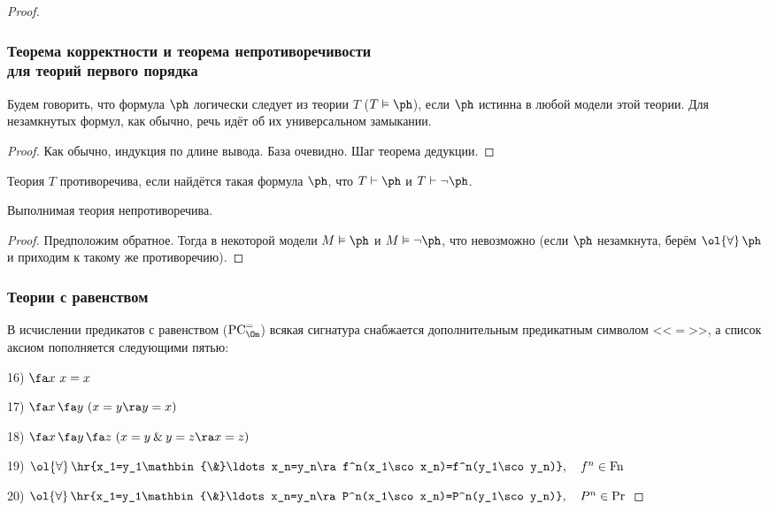 \documentclass[a4paper,draft]{article}
\let\amper\&
\def\&{\mathbin{\amper}}
\def\ufa{\ol{\forall}\,}
\def\fora#1{\fa#1\,}
\newcommand{\vv}{\vDash}
\DeclareMathOperator{\Fn}{Fn}
\DeclareMathOperator{\PC}{PC}
\begin{document}
\begin{proof}
\subsubsection{Теорема корректности и теорема непротиворечивости\\ для теорий первого порядка}

\begin{df}
Будем говорить, что формула $\ph$ логически следует из теории $T$ ($T\vDash\ph$), если $\ph$ истинна в любой модели этой теории.
Для незамкнутых формул, как обычно, речь идёт об их универсальном замыкании.
\end{df}
\begin{theorem}
\equ{T\vdash\ph\Ra T\vv\ph.}
\end{theorem}
\begin{proof}
Как обычно, индукция по длине вывода. База очевидно. Шаг теорема дедукции.
\end{proof}
\begin{df}
Теория $T$ противоречива, если найдётся такая формула $\ph$, что $T\vdash\ph$ и $T\vdash\neg\ph$.
\end{df}
\begin{theorem}
Выполнимая теория непротиворечива.
\end{theorem}
\begin{proof}
Предположим обратное. Тогда в некоторой модели $M\vv\ph$ и $M\vv\neg\ph$, что невозможно
(если $\ph$ незамкнута, берём $\ufa\ph$ и приходим к такому же противоречию).
\end{proof}

\subsubsection{Теории с равенством}

В исчислении предикатов с равенством ($\PC_\Om^=$) всякая сигнатура снабжается дополнительным предикатным символом <<$=$>>,
а список аксиом пополняется следующими пятью:

16) $\fora x\,x=x$

17) $\fora x\fora y\,(x=y\ra y=x)$

18) $\fora x\fora y\fora z\,(x=y\&y=z\ra x=z)$

19) $\ufa\hr{x_1=y_1\&\ldots x_n=y_n\ra f^n(x_1\sco x_n)=f^n(y_1\sco y_n)},\quad f^n\in\Fn$

20) $\ufa\hr{x_1=y_1\&\ldots x_n=y_n\ra P^n(x_1\sco x_n)=P^n(y_1\sco y_n)},\quad P^n\in\Pr$


\end{proof}
\end{document}
